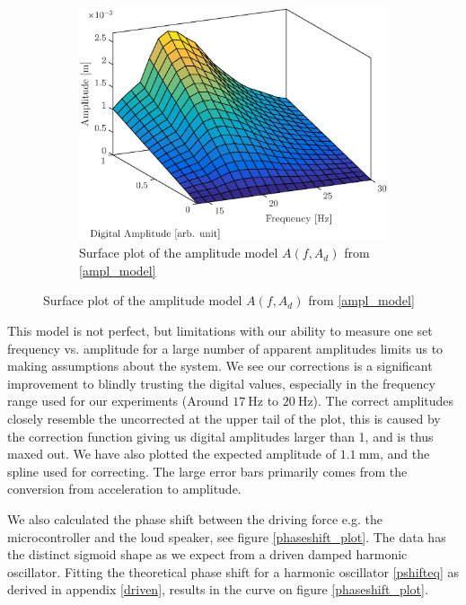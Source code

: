 \documentclass[12pt,oneside,a4paper]{article}
\numberwithin{equation}{section}
\begin{document}
{{{{\begin{figure}[h]
\begin{subfigure}[t]{0.49\textwidth}
		\label{frq_vs_ampl_plot}
	\end{subfigure}\hfill
	\begin{subfigure}[t]{0.49\textwidth}
		\centering
		\includegraphics[width=\textwidth]{surfplot}
		\caption{Surface plot of the amplitude model $A(f,A_{d})$ from \eqref{ampl_model}}
	\end{subfigure}
\end{figure}
This model is not perfect, but limitations with our ability to measure one set frequency vs. amplitude for a large number of apparent amplitudes limits us to making assumptions about the system. We see our corrections is a significant improvement to blindly trusting the digital values, especially in the frequency range used for our experiments (Around $\SI{17}{\hertz}$ to $\SI{20}{\hertz}$). The correct amplitudes closely resemble the uncorrected at the upper tail of the plot, this is caused by the correction function giving us digital amplitudes larger than 1, and is thus maxed out. We have also plotted the expected amplitude of $\SI{1.1}{\mm}$, and the spline used for correcting. The large error bars primarily comes from the conversion from acceleration to amplitude.

We also calculated the phase shift between the driving force e.g. the microcontroller and the loud speaker, see figure \ref{phaseshift_plot}. The data has the distinct sigmoid shape as we expect from a driven damped harmonic oscillator. Fitting the theoretical phase shift for a harmonic oscillator \ref{pshifteq} as derived in appendix \ref{driven}, results in the curve on figure \ref{phaseshift_plot}.
 
}}}}
\end{document}
